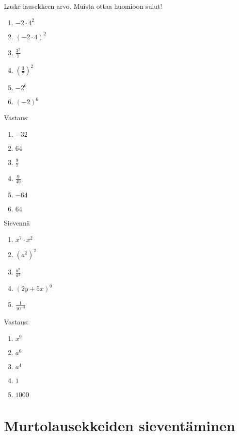 \begin{tehtava}
Laske lausekkeen arvo. Muista ottaa huomioon sulut!
\begin{enumerate}
\item $-2\cdot 4^2$
\item $(-2\cdot 4)^2$
\item $\frac{3^2}{7}$
\item $\left( \frac{3}{7} \right)^2$
\item $-2^6$
\item $(-2)^6$
\end{enumerate}
\begin{vastaus}
Vastaus:
\begin{enumerate}
\item $-32$
\item $64$
\item $\frac{9}{7}$
\item $\frac{9}{49}$
\item $-64$
\item $64$
\end{enumerate}
\end{vastaus}
\end{tehtava}

\begin{tehtava}
Sievennä
\begin{enumerate}
\item $x^7\cdot x^2$
\item $(a^3)^2$
\item $\frac{a^8}{a^2}$
\item $(2y+5x)^0$
\item $\frac{1}{10^{-3}}$
\end{enumerate}
\begin{vastaus}
Vastaus:
\begin{enumerate}
\item $x^9$
\item $a^6$
\item $a^4$
\item $1$
\item $1000$
\end{enumerate}
\end{vastaus}
\end{tehtava}

\section{Murtolausekkeiden sieventäminen}

